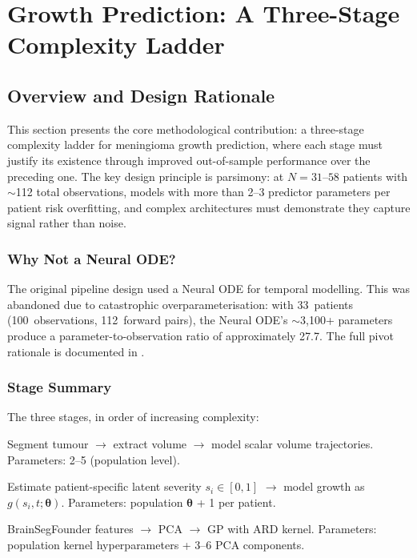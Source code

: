 \section{Growth Prediction: A Three-Stage Complexity Ladder}
\label{sec:growth}

\subsection{Overview and Design Rationale}
\label{sec:growth:overview}

This section presents the core methodological contribution: a three-stage
complexity ladder for meningioma growth prediction, where each stage must
justify its existence through improved out-of-sample performance over the
preceding one. The key design principle is parsimony: at $N = 31$--$58$
patients with $\sim$112 total observations, models with more than 2--3
predictor parameters per patient risk overfitting, and complex architectures
must demonstrate they capture signal rather than noise.

\subsubsection{Why Not a Neural ODE?}

The original pipeline design used a Neural ODE
\cite{chen2018neural,rubanova2019latent} for temporal modelling. This was
abandoned due to catastrophic overparameterisation: with 33~patients
(100~observations, 112~forward pairs), the Neural ODE's $\sim$3,100+
parameters produce a parameter-to-observation ratio of approximately 27.7.
The full pivot rationale is documented in \cite{pascual2026pivot}.

\subsubsection{Stage Summary}

The three stages, in order of increasing complexity:
\begin{description}[leftmargin=*,labelwidth=!]
  \item[Stage 1:] Segment tumour $\to$ extract volume $\to$ model scalar
    volume trajectories. Parameters: 2--5 (population level).
  \item[Stage 2:] Estimate patient-specific latent severity $s_i \in [0, 1]$
    $\to$ model growth as $g(s_i, t; \boldsymbol{\theta})$. Parameters:
    population $\boldsymbol{\theta}$ + 1 per patient.
  \item[Stage 3:] BrainSegFounder features $\to$ PCA $\to$ GP with ARD
    kernel. Parameters: population kernel hyperparameters + 3--6 PCA
    components.
\end{description}

